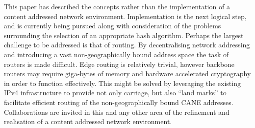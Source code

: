 \documentclass[british,english]{article}
\begin{document}
This paper has described the concepts rather than the implementation
of a content addressed network environment. Implementation is the
next logical step, and is currently being pursued along with consideration
of the problems surrounding the selection of an appropriate hash algorithm.
Perhaps the largest challenge to be addressed is that of routing.
By decentralising network addressing and introducing a vast non-geographically
bound address space the task of routers is made difficult. Edge routing
is relatively trivial, however backbone routers may require giga-bytes
of memory and hardware accelerated cryptography in order to function
effectively. This might be solved by leveraging the existing IPv4
infrastructure to provide not only carriage, but also {}``land marks''
to facilitate efficient routing of the non-geographically bound CANE
addresses. Collaborations are invited in this and any other area of
the refinement and realisation of a content addressed network environment.



\end{document}
